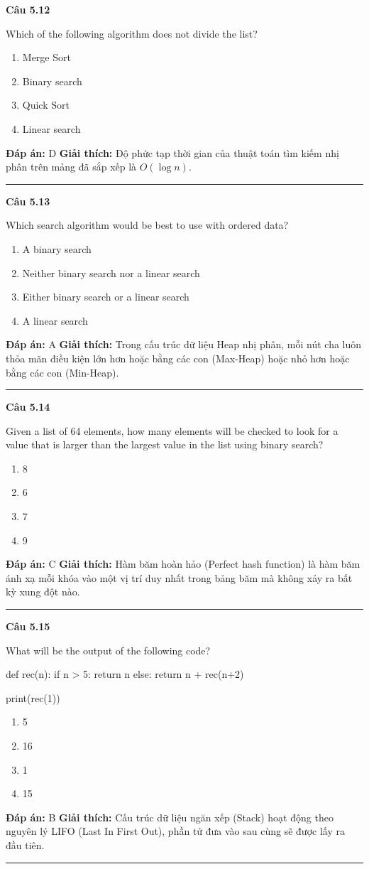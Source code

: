 \documentclass[11pt,a4paper]{article}
\newenvironment{question}[1]{%
  \par\vspace{1em}\noindent\textbf{\large Câu #1}\par\vspace{0.4em}
}{%
  \par\vspace{1em}\hrule\vspace{0.6em}
}
\newenvironment{choices}{%
  \begin{enumerate}[label=\textbf{\Alph*.},leftmargin=2.2em,itemsep=2pt,topsep=3pt]
}{%
  \end{enumerate}
}
\newcommand{\choice}{\item}
\newenvironment{codebox}{%
  \begin{tcolorbox}[colback=gray!8!white,colframe=gray!50!black,arc=1.5mm,boxrule=0.6pt,left=3mm,right=3mm,top=2.5mm,bottom=2.5mm]
  \ttfamily\small
}{%
  \end{tcolorbox}
}
\begin{document}
\begin{question}{5.12}
Which of the following algorithm does not divide the list?
\begin{choices}
\choice Merge Sort
\choice Binary search
\choice Quick Sort
\choice Linear search
\end{choices}
\textbf{Đáp án:} D
\textbf{Giải thích:} Độ phức tạp thời gian của thuật toán tìm kiếm nhị phân trên mảng đã sắp xếp là $O(\log n)$.
\end{question}

\begin{question}{5.13}
Which search algorithm would be best to use with ordered data?
\begin{choices}
\choice A binary search
\choice Neither binary search nor a linear search
\choice Either binary search or a linear search
\choice A linear search
\end{choices}
\textbf{Đáp án:} A
\textbf{Giải thích:} Trong cấu trúc dữ liệu Heap nhị phân, mỗi nút cha luôn thỏa mãn điều kiện lớn hơn hoặc bằng các con (Max-Heap) hoặc nhỏ hơn hoặc bằng các con (Min-Heap).
\end{question}

\begin{question}{5.14}
Given a list of 64 elements, how many elements will be checked to look for a value that is larger than the largest value in the list using binary search?
\begin{choices}
\choice 8
\choice 6
\choice 7
\choice 9
\end{choices}
\textbf{Đáp án:} C
\textbf{Giải thích:} Hàm băm hoàn hảo (Perfect hash function) là hàm băm ánh xạ mỗi khóa vào một vị trí duy nhất trong bảng băm mà không xảy ra bất kỳ xung đột nào.
\end{question}

\begin{question}{5.15}
What will be the output of the following code?
\begin{codebox}
def rec(n):
    if n > 5:
        return n
    else:
        return n + rec(n+2)

print(rec(1))
\end{codebox}
\begin{choices}
\choice 5
\choice 16
\choice 1
\choice 15
\end{choices}
\textbf{Đáp án:} B
\textbf{Giải thích:} Cấu trúc dữ liệu ngăn xếp (Stack) hoạt động theo nguyên lý LIFO (Last In First Out), phần tử đưa vào sau cùng sẽ được lấy ra đầu tiên.
\end{question}
\end{document}
